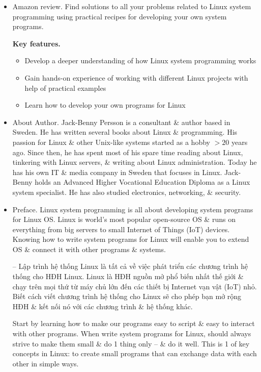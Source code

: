 \documentclass{article}
\begin{document}
\begin{itemize}
    \item {\sf Amazon review.} Find solutions to all your problems related to Linux system programming using practical recipes for developing your own system programs.
    
    {\bf Key features.}
    \begin{itemize}
        \item Develop a deeper understanding of how Linux system programming works
        \item Gain hands-on experience of working with different Linux projects with help of practical examples
        \item Learn how to develop your own programs for Linux
    \end{itemize}
    \item {\sf About Author.} {\sc Jack-Benny Persson} is a consultant \& author based in Sweden. He has written several books about Linux \& programming. His passion for Linux \& other Unix-like systems started as a hobby $> 20$ years ago. Since then, he has spent most of his spare time reading about Linux, tinkering with Linux servers, \& writing about Linux administration. Today he has his own IT \& media company in Sweden that focuses in Linux. {\sc Jack-Benny} holds an Advanced Higher Vocational Education Diploma as a Linux system specialist. He has also studied electronics, networking, \& security.
    \item {\sf Preface.} Linux system programming is all about developing system programs for Linux OS. Linux is world's most popular open-source OS \& runs on everything from big servers to small Internet of Things (IoT) devices. Knowing how to write system programs for Linux will enable you to extend OS \& connect it with other programs \& systems.
    
    -- Lập trình hệ thống Linux là tất cả về việc phát triển các chương trình hệ thống cho HĐH Linux. Linux là HĐH nguồn mở phổ biến nhất thế giới \& chạy trên mọi thứ từ máy chủ lớn đến các thiết bị Internet vạn vật (IoT) nhỏ. Biết cách viết chương trình hệ thống cho Linux sẽ cho phép bạn mở rộng HĐH \& kết nối nó với các chương trình \& hệ thống khác.
    
    Start by learning how to make our programs easy to script \& easy to interact with other programs. When write system programs for Linux, should always strive to make them small \& do 1 thing only -- \& do it well. This is 1 of key concepts in Linux: to create small programs that can exchange data with each other in simple ways.
    

\end{itemize}
\end{document}
